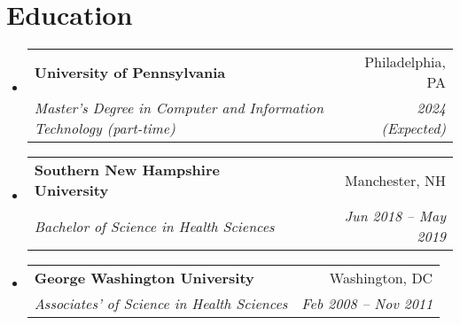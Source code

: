 \documentclass[letterpaper,11pt]{article}
\makeatletter
\newcommand{\resumeSubheading}[4]{
  \vspace{-1pt}\item
    \begin{tabular*}{0.97\textwidth}{l@{\extracolsep{\fill}}r}
      \textbf{#1} & #2 \\
      \textit{\small#3} & \textit{\small #4} \\
    \end{tabular*}\vspace{-5pt}
}
\newcommand{\resumeSubHeadingListStart}{\begin{itemize}[leftmargin=*]}
\newcommand{\resumeSubHeadingListEnd}{\end{itemize}}
\makeatother
\begin{document}
 
\section{Education}
  \resumeSubHeadingListStart
    \resumeSubheading
      {University of Pennsylvania}{Philadelphia, PA}
      {Master's Degree in Computer and Information Technology (part-time)}{2024 (Expected)}
    \resumeSubheading
      {Southern New Hampshire University}{Manchester, NH}
      {Bachelor of Science in Health Sciences}{Jun 2018 -- May 2019}
      \resumeSubheading
      {George Washington University}{Washington, DC}
      {Associates' of Science in Health Sciences}{Feb 2008 -- Nov 2011}
  \resumeSubHeadingListEnd


\end{document}

